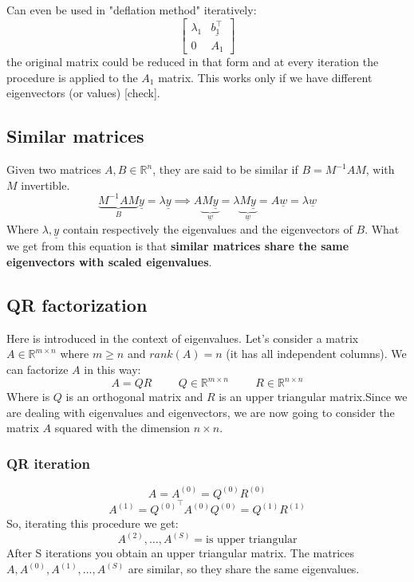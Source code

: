 Can even be used in "deflation method" iteratively:
\[
    \begin{bmatrix}
        \lambda_1 & \underline{b_1^\intercal}\\
        0 & A_1
    \end{bmatrix}    
\]
the original matrix could be reduced in that form and at every iteration the procedure is applied to the $A_1$ matrix. This works only if we have different eigenvectors (or values) [check].

\subsection{Similar matrices}
Given two matrices $A, B \in \mathbb{R}^n$, they are said to be similar if $B = M^{-1}AM$, with $M$ invertible. 
\[
    \underbrace{M^{-1}AM}_{B}\underline{y} = \lambda \underline{y} \implies A\underbrace{M\underline{y}}_{\underline{w}} = \lambda \underbrace{M\underline{y}}_{\underline{w}} = A\underline{w} = \lambda \underline{w}    
\]
Where $\lambda, \underline{y}$ contain respectively the eigenvalues and the eigenvectors of $B$. What we get from this equation is that \textbf{similar matrices share the same eigenvectors with scaled eigenvalues}.

\subsection{QR factorization}
Here is introduced in the context of eigenvalues. Let's consider a matrix $A \in \mathbb{R}^{m\times n}$ where $m \geq n$ and $rank(A) = n$ (it has all independent columns). We can factorize $A$ in this way:
\[
    A = QR \hspace{1cm} Q \in \mathbb{R}^{m\times n} \hspace{1cm} R \in \mathbb{R}^{n\times n}
\]
Where is $Q$ is an orthogonal matrix and $R$ is an upper triangular matrix.Since we are dealing with eigenvalues and eigenvectors, we are now going to consider the matrix $A$ squared with the dimension $n\times n$.

\subsubsection{QR iteration} 
\[
    A = A^{(0)} = Q^{(0)}R^{(0)}     
\]
\[
    A^{(1)} = {Q^{(0)}}^{\intercal} A^{(0)} Q^{(0)} = Q^{(1)} R^{(1)}    
\]
So, iterating this procedure we get:
\[
    A^{(2)}, \dots, A^{(S)} = \text{is upper triangular}
\]
After S iterations you obtain an upper triangular matrix. The matrices $A, A^{(0)}, A^{(1)}, \dots, A^{(S)}$ are similar, so they share the same eigenvalues.

